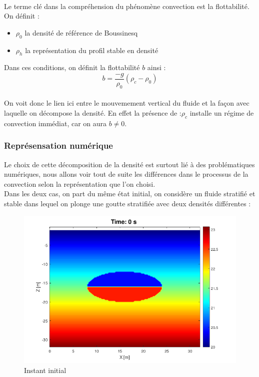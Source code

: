 \documentclass{rapportECC}
\begin{document}
\\
\vspace{0.5 cm}
Le terme clé dans la compréhension du phénomène convection est la flottabilité. \\
On définit :
\begin{itemize}
    \item $\rho_0$ la densité de référence de Boussinesq
    \item $\rho_h$ la représentation du profil stable en densité
\end{itemize}
Dans ces conditions, on définit la flottabilité $b$ ainsi :
\begin{equation}
    b = \dfrac{-g}{\rho_0}(\rho_c - \rho_0)
\end{equation}
\\
On voit donc le lien ici entre le mouvemement vertical du fluide et la façon avec laquelle on décompose la densité. En effet la présence de :$\rho_c$ installe un régime de convection immédiat, car on aura $b \neq 0$.\\

\subsubsection{Représensation numérique}

Le choix de cette décomposition de la densité est surtout lié à  des problématiques numériques, nous allons voir tout de suite les différences dans le processus de la convection selon la représentation que l'on choisi. \\
Dans les deux cas, on part du même état initial, on considère un fluide stratifié et stable dans lequel on plonge une goutte stratifiée avec deux densités différentes :

\begin{figure}[H]
    \centering
    \includegraphics[width=0.7
    \textwidth]{images/Int_ConvT0.png}
    \caption{Instant initial}
\end{figure}
\end{document}

